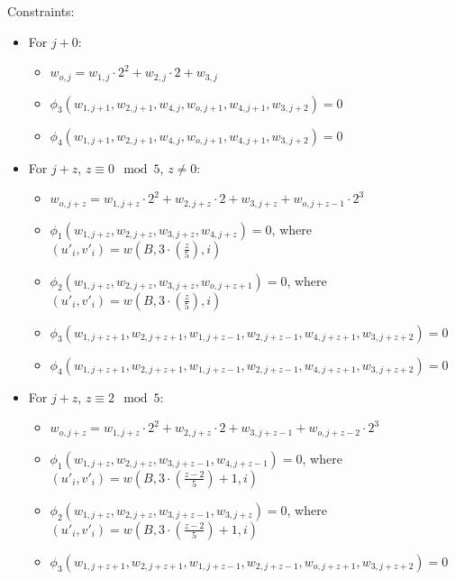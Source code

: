 Constraints:
\begin{itemize}
    \item For $j + 0$:
        \begin{itemize}
            \item $w_{o, j} = w_{1, j} \cdot 2^2 + w_{2, j} \cdot 2 + w_{3, j}$
            \item $\phi_3(w_{1, j + 1}, w_{2, j + 1}, w_{4, j}, w_{o, j + 1}, w_{4, j + 1}, w_{3, j + 2}) = 0$
            \item $\phi_4(w_{1, j + 1}, w_{2, j + 1}, w_{4, j}, w_{o, j + 1}, w_{4, j + 1}, w_{3, j + 2}) = 0$
        \end{itemize}
    \item For $j + z$, $z \equiv 0 \mod 5$, $z \neq 0$:
        \begin{itemize}
            \item $w_{o, j + z} = w_{1, j + z} \cdot 2^2 + w_{2, j + z} \cdot 2 + w_{3, j + z} + w_{o, j + z - 1} \cdot 2^3$
            \item $\phi_1(w_{1, j + z}, w_{2, j + z}, w_{3, j + z}, w_{4, j + z}) = 0$, where $(u'_{i}, v'_{i}) = w(B, 3 \cdot (\frac{z}{5}), i)$
            \item $\phi_2(w_{1, j + z}, w_{2, j + z}, w_{3, j + z}, w_{o, j + z + 1}) = 0$, where $(u'_{i}, v'_{i}) = w(B, 3 \cdot (\frac{z}{5}), i)$
            \item $\phi_3(w_{1, j + z + 1}, w_{2, j + z + 1}, w_{1, j + z - 1}, w_{2, j + z - 1}, w_{4, j + z + 1}, w_{3, j + z + 2}) = 0$
            \item $\phi_4(w_{1, j + z + 1}, w_{2, j + z + 1}, w_{1, j + z - 1}, w_{2, j + z - 1}, w_{4, j + z + 1}, w_{3, j + z + 2}) = 0$
        \end{itemize}
    \item For $j + z$, $z \equiv 2 \mod 5$:
        \begin{itemize}
            \item $w_{o, j + z} = w_{1, j + z} \cdot 2^2 + w_{2,j + z} \cdot 2 + w_{3, j + z - 1} + w_{o, j+ z - 2} \cdot 2^3$
            \item $\phi_1(w_{1, j + z}, w_{2, j + z}, w_{3, j + z - 1}, w_{4, j + z - 1}) = 0$, where $(u'_{i}, v'_{i}) = w(B, 3 \cdot (\frac{z - 2}{5}) + 1, i)$
            \item $\phi_2(w_{1, j + z}, w_{2, j + z}, w_{3, j + z - 1}, w_{3, j + z}) = 0$, where $(u'_{i}, v'_{i}) = w(B, 3 \cdot (\frac{z - 2}{5}) + 1, i)$
            \item $\phi_3(w_{1, j + z + 1}, w_{2, j + z + 1}, w_{1, j + z - 1}, w_{2, j + z - 1}, w_{o, j + z + 1}, w_{3, j + z + 2}) = 0$

\end{itemize}
\end{itemize}
